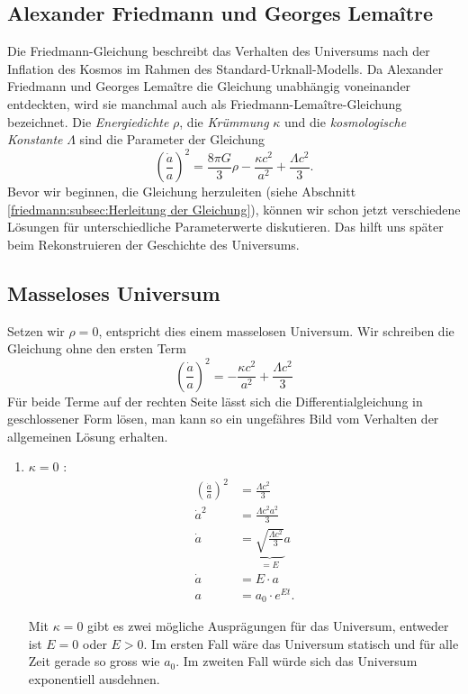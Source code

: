 \begin{refsection}
\section{Alexander Friedmann und Georges Lema\^{i}tre}
Die Friedmann-Gleichung beschreibt das Verhalten des Universums nach der Inflation des Kosmos im Rahmen des Standard-Urknall-Modells. Da Alexander Friedmann und Georges Lema\^{i}tre die Gleichung unabhängig voneinander entdeckten, wird sie manchmal auch als Friedmann-Lema\^{i}tre-Gleichung bezeichnet. Die {\em Energiedichte} $\rho$, die {\em Krümmung} $\kappa$ und die {\em kosmologische Konstante} $\Lambda$ sind die Parameter der Gleichung
\begin{equation}
\left(\frac{\dot{a}}{a}\right) ^2 = \frac{8 \pi G}{3} \rho - \frac{\kappa c^2}{a^2} + \frac{\Lambda c^2}{3}.
\end{equation}
Bevor wir beginnen, die Gleichung herzuleiten (siehe Abschnitt \ref{friedmann:subsec:Herleitung der Gleichung}), können wir schon jetzt verschiedene Lösungen für unterschiedliche Parameterwerte diskutieren. Das hilft uns später beim Rekonstruieren der Geschichte des Universums.

\subsection{Masseloses Universum \label{friedmann:masselosesUniversum}}
Setzen wir $\rho = 0$, entspricht dies einem masselosen Universum.  Wir schreiben die Gleichung ohne den ersten Term
\[\left(\frac{\dot{a}}{a}\right) ^2 = - \frac{\kappa c^2}{a^2} + \frac{\Lambda c^2}{3}\]
Für beide Terme auf der rechten Seite lässt sich die Differentialgleichung in geschlossener Form lösen, man kann so ein ungefähres Bild vom Verhalten der allgemeinen Lösung erhalten.
\begin{enumerate}
	\item $\kappa = 0$ :
		\begin{align}
			\nonumber \left(\frac{\dot{a}}{a}\right) ^2 &= \frac{\Lambda c^2}{3} \\
			\nonumber \dot{a} ^2 &= \frac{\Lambda c^2 a^2}{3}  \\
			\nonumber \dot{a} &= \underbrace{\sqrt{\frac{\Lambda c^2}{3}}}_{\displaystyle=E} a \\
			\nonumber \dot{a} &= E \cdot a \\
			a &= a_0 \cdot e^{Et}.\label{friedmann:Lambda}
		\end{align}
	
	
Mit $\kappa = 0$ gibt es zwei mögliche Ausprägungen für das Universum, entweder ist $E = 0$ oder $E > 0$. Im ersten Fall wäre das Universum statisch und für alle Zeit gerade so gross wie $a_0$. Im zweiten Fall würde sich das Universum exponentiell ausdehnen.
		

\end{enumerate}
\end{refsection}
